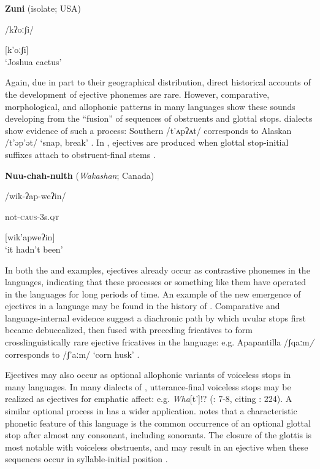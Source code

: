 \ea\label{ex:4.42}
  \textbf{Zuni} (isolate; USA)

/kʔoːʃi/

[k’oːʃi]\\
\glt ‘Joshua cactus’
\citep[16]{Newman1965}
\z

  Again, due in part to their geographical distribution, direct historical accounts of the development of ejective phonemes are rare. However, comparative, morphological, and allophonic patterns in many languages show these sounds developing from the ``fusion'' of sequences of obstruents and glottal stops.  dialects show evidence of such a process: Southern  /t’ʌpʔʌt/ corresponds to Alaskan  /t’əp’ət/ ‘snap, break’ \citep[312]{Fallon2002}. In , ejectives are produced when glottal stop-initial suffixes attach to obstruent-final stems .

\ea\label{ex:4.43}
  \textbf{Nuu-chah-nulth} (\textit{Wakashan}; Canada)

/wik-ʔap-weʔin/

not-\textsc{caus}-3s.\textsc{qt}

[wik’apweʔin]\\
\glt ‘it hadn’t been’
\citep[69]{Stonham1999}
\z

  In both the  and  examples, ejectives already occur as contrastive phonemes in the languages, indicating that these processes or something like them have operated in the languages for long periods of time. An example of the new emergence of ejectives in a language may be found in the history of . Comparative and language-internal evidence suggest a diachronic path by which uvular stops first became debuccalized, then fused with preceding fricatives to form crosslinguistically rare ejective fricatives in the language: e.g. Apapantilla /ʃqaːm\textit{/} corresponds to  /ʃ’aːm/ ‘corn husk’ \citep[6]{Beck2006}.

  Ejectives may also occur as optional allophonic variants of voiceless stops in many languages. In many dialects of , utterance-final voiceless stops may be realized as ejectives for emphatic affect: e.g. \textit{Wha}[t’]!? (\citealt{Fallon2002}: 7-8, citing \citealt{Taylor1995}: 224). A similar optional process in  has a wider application. \citet{Vidal2001} notes that a characteristic phonetic feature of this language is the common occurrence of an optional glottal stop after almost any consonant, including sonorants. The closure of the glottis is most notable with voiceless obstruents, and may result in an ejective when these sequences occur in syllable-initial position .

